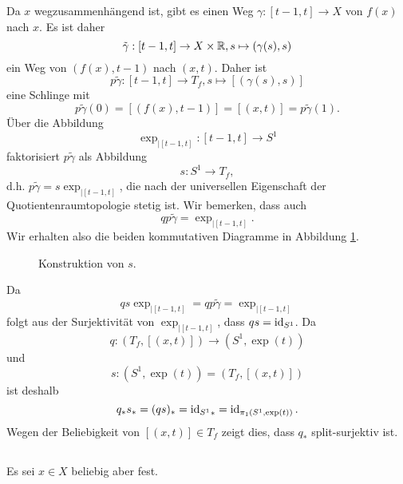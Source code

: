 \documentclass[a4paper,10pt]{article}
\begin{document}
Da $x$ wegzusammenhängend ist, gibt es einen Weg $\gamma : [t-1,t] \to X$ von $f(x)$ nach $x$. Es ist daher
\[
 \tilde{\gamma} : [t-1,t] \to X \times \mathbb{R}, s \mapsto (\gamma(s),s)
\]
ein Weg von $(f(x),t-1)$ nach $(x,t)$. Daher ist
\[
 p \tilde{\gamma} : [t-1,t] \to T_f, s \mapsto [(\gamma(s),s)]
\]
eine Schlinge mit
\[
 p\tilde{\gamma}(0) = [(f(x),t-1)] = [(x,t)] = p\tilde{\gamma}(1).
\]
Über die Abbildung
\[
 \exp_{|[t-1,t]} : [t-1,t] \to S^1
\]
faktorisiert $p\tilde{\gamma}$ als Abbildung
\[
 s : S^1 \to T_f,
\]
d.h. $p \tilde{\gamma} = s \exp_{|[t-1,t]}$, die nach der universellen Eigenschaft der Quotientenraumtopologie stetig ist.
Wir bemerken, dass auch
\[
 q p \tilde{\gamma} = \exp_{|[t-1,t]}.
\]
Wir erhalten also die beiden kommutativen Diagramme in Abbildung \ref{fig: Konstruktion von s}.
\begin{figure}\centering
 \caption{Konstruktion von $s$.}
 \label{fig: Konstruktion von s}
\end{figure}


Da
\[
 q s \exp_{|[t-1,t]} = q p \tilde{\gamma} = \exp_{|[t-1,t]}
\]
folgt aus der Surjektivität von $\exp_{|[t-1,t]}$, dass $qs = \operatorname{id}_{S^1}$. Da
\[
 q : (T_f, [(x,t)]) \to (S^1, \exp(t))
\]
und
\[
 s : (S^1, \exp(t)) = (T_f, [(x,t)])
\]
ist deshalb
\[
 q_* s_* = (qs)_* = {\operatorname{id}_{S^1}}_* = \operatorname{id}_{\pi_1(S^1,\exp(t))}.
\]
Wegen der Beliebigkeit von $[(x,t)] \in T_f$ zeigt dies, dass $q_*$ split-surjektiv ist.


\subsection{}
Es sei $x \in X$ beliebig aber fest.
\end{document}
